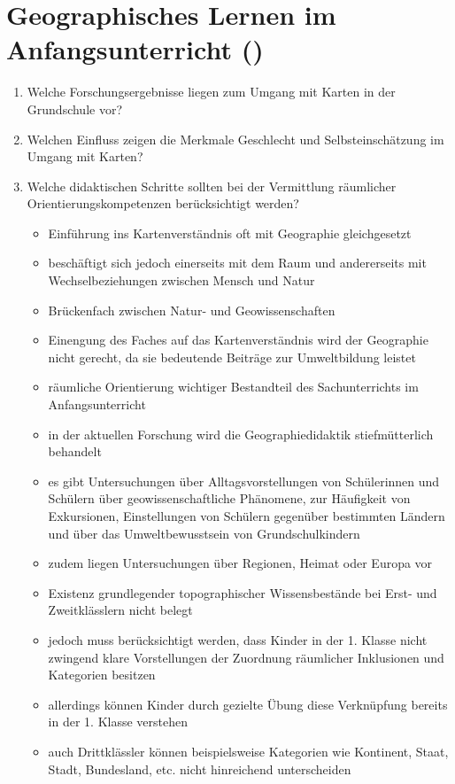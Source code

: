 \section{Geographisches Lernen im Anfangsunterricht (\cite[S.\,159-176]{IH07})}
\begin{enumerate}
	\item{Welche Forschungsergebnisse liegen zum Umgang mit Karten in der Grundschule vor?}
	\item{Welchen Einfluss zeigen die Merkmale \glqq Geschlecht\grqq{} und \glqq Selbsteinschätzung\grqq{} im Umgang mit Karten?}
	\item{
		Welche didaktischen Schritte sollten bei der Vermittlung räumlicher Orientierungskompetenzen berücksichtigt werden?
		\begin{itemize}
			\item{Einführung ins Kartenverständnis oft mit Geographie gleichgesetzt}
			\item{beschäftigt sich jedoch einerseits mit dem Raum und andererseits mit Wechselbeziehungen zwischen Mensch und Natur}
			\item{Brückenfach zwischen Natur- und Geowissenschaften}
			\item{Einengung des Faches auf das Kartenverständnis wird der Geographie nicht gerecht, da sie bedeutende Beiträge zur Umweltbildung leistet}
			\item{räumliche Orientierung wichtiger Bestandteil des Sachunterrichts im Anfangsunterricht}
			\item{in der aktuellen Forschung wird die Geographiedidaktik stiefmütterlich behandelt}
			\item{es gibt Untersuchungen über Alltagsvorstellungen von Schülerinnen und Schülern über geowissenschaftliche Phänomene, zur Häufigkeit von Exkursionen, Einstellungen von Schülern gegenüber bestimmten Ländern und über das Umweltbewusstsein von Grundschulkindern}
			\item{zudem liegen Untersuchungen über Regionen, Heimat oder Europa vor}
			\item{Existenz grundlegender topographischer Wissensbestände bei Erst- und Zweitklässlern nicht belegt}
			\item{jedoch muss berücksichtigt werden, dass Kinder in der 1. Klasse nicht zwingend klare Vorstellungen der Zuordnung räumlicher Inklusionen und Kategorien besitzen}
			\item{allerdings können Kinder durch gezielte Übung diese Verknüpfung bereits in der 1. Klasse verstehen}
			\item{auch Drittklässler können beispielsweise Kategorien wie Kontinent, Staat, Stadt, Bundesland, etc. nicht hinreichend unterscheiden}

\end{itemize}}
\end{enumerate}
